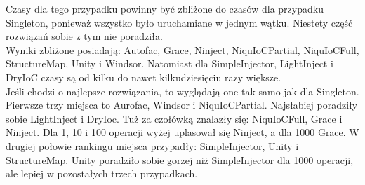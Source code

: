 \documentclass[12pt]{article}
\begin{document}
Czasy dla tego przypadku powinny być zbliżone do czasów dla przypadku Singleton, ponieważ wszystko było uruchamiane w jednym wątku. Niestety część rozwiązań sobie z tym nie poradziła.\\
Wyniki zbliżone posiadają: Autofac, Grace, Ninject, NiquIoCPartial, NiquIoCFull, StructureMap, Unity i Windsor. Natomiast dla SimpleInjector, LightInject i DryIoC czasy są od kilku do nawet kilkudziesięciu razy większe.\\
Jeśli chodzi o najlepsze rozwiązania, to wyglądają one tak samo jak dla Singleton. Pierwsze trzy miejsca to Aurofac, Windsor i NiquIoCPartial. Najsłabiej poradziły sobie LightInject i DryIoc. Tuż za czołówką znalazły się: NiquIoCFull, Grace i Ninject. Dla 1, 10 i 100 operacji wyżej uplasował się Ninject, a dla 1000 Grace. W drugiej połowie rankingu miejsca przypadły: SimpleInjector, Unity i StructureMap. Unity poradziło sobie gorzej niż SimpleInjector dla 1000 operacji, ale lepiej w pozostałych trzech przypadkach.
\end{document}
